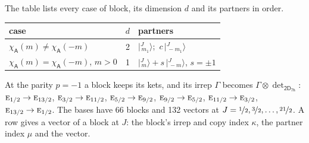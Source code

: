 \documentclass[10pt,a4paper]{article}
\numberwithin{equation}{section}
\newcommand{\grp}[1]{\mathsf{#1}}
\newcommand{\irr}[1]{\text{\normalfont\scshape #1}}
\newcommand{\chiA}{\chi_{\grp{A}}}
\newcommand{\irrprod}{\otimes}
\newcommand{\mult}{\kappa}
\newcommand{\intx}{\mu}
\newcommand{\jm}[2]{\bigl\lvert{}^{#1}_{\,#2}\bigr\rangle}
\begin{document}
\leavevmode\label{n:head.case}\label{n:head.partners}The table lists every case of block, its dimension $d$ and its partners in order.
\begin{center}\begin{tabular}{@{}lrl@{}}\toprule
case & $d$ & partners\\\midrule
$\chiA(m) \ne \chiA(-m)$ & 2 & $\jm{J}{m_1}$;\ $c\,\jm{J}{-m_1}$\\
$\chiA(m) = \chiA(-m)$, $m > 0$ & 1 & $\jm{J}{m} + s\,\jm{J}{-m}$, $s = \pm1$\\
\bottomrule\end{tabular}\end{center}
At the parity $p = -1$ a block keeps its kets, and its irrep $\Gamma$ becomes $\Gamma \irrprod \det_{\grp{2D_{7h}}}$: $\irr{e}_{1/2} \to \irr{e}_{13/2}$, $\irr{e}_{3/2} \to \irr{e}_{11/2}$, $\irr{e}_{5/2} \to \irr{e}_{9/2}$, $\irr{e}_{9/2} \to \irr{e}_{5/2}$, $\irr{e}_{11/2} \to \irr{e}_{3/2}$, $\irr{e}_{13/2} \to \irr{e}_{1/2}$.
The bases have 66 blocks and 132 vectors at $J = \nicefrac{1}{2}, \nicefrac{3}{2}, \dots, \nicefrac{21}{2}$. \label{n:head.vector}A row gives a vector of a block at $J$: the block's irrep and copy index $\mult$, the partner index $\intx$ and the vector.
\end{document}
